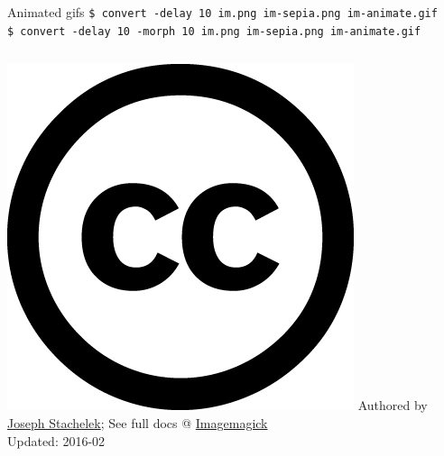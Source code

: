 \documentclass[hyperref={colorlinks,citecolor=pink,linkcolor=red,urlcolor=blue}]{beamer}
\begin{document}
\begin{frame}

\begin{minipage}[0.2\textheight]{\textwidth}
	\begin{columns}[T]
			\begin{exampleblock}{Animated gifs}
				\texttt{\$ convert -delay 10 im.png im-sepia.png im-animate.gif}\\
				\texttt{\$ convert -delay 10 -morph 10 im.png im-sepia.png im-animate.gif}
			\end{exampleblock}	
	\end{columns}
\end{minipage}


\href{https://creativecommons.org/licenses/by/4.0/}{\includegraphics[height=.15in]{cc.large.png}} Authored by \href{http://jsta.github.io}{Joseph Stachelek}; See full docs @
\href{http://www.imagemagick.org}{Imagemagick}\\
Updated: 2016-02 
\end{frame}
\end{document}
